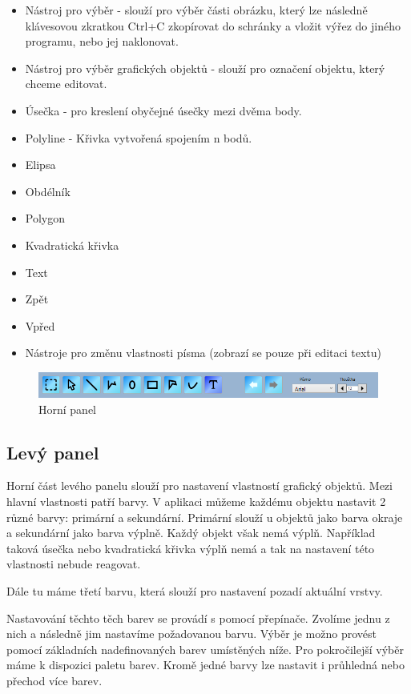\documentclass[
  field=inf,
  biblatex,
  glossaries,
  index
]{kidiplom}
\begin{document}
\begin{itemize}
\item Nástroj pro výběr - slouží pro výběr části obrázku, který lze následně klávesovou zkratkou Ctrl+C zkopírovat do schránky a vložit výřez do jiného programu, nebo jej naklonovat.
\item Nástroj pro výběr grafických objektů - slouží pro označení objektu, který chceme editovat.
\item Úsečka - pro kreslení obyčejné úsečky mezi dvěma body.
\item Polyline - Křivka vytvořená spojením n bodů.
\item Elipsa
\item Obdélník
\item Polygon
\item Kvadratická křivka
\item Text
\item Zpět
\item Vpřed
\item Nástroje pro změnu vlastnosti písma (zobrazí se pouze při editaci textu)
\end{itemize}
\newpage
\begin{figure}
\includegraphics[width=16cm]{img/toppanel}
\caption{Horní panel}
\end{figure}


\subsection{Levý panel}

Horní část levého panelu slouží pro nastavení vlastností grafický objektů. Mezi hlavní vlastnosti patří barvy. V aplikaci můžeme každému objektu nastavit 2 různé barvy: primární a sekundární. Primární slouží u objektů jako barva okraje a sekundární jako barva výplně. Každý objekt však nemá výplň. Například taková úsečka nebo kvadratická křivka výplň nemá a tak na nastavení této vlastnosti nebude reagovat. 

Dále tu máme třetí barvu, která slouží pro nastavení pozadí aktuální vrstvy.

Nastavování těchto těch barev se provádí s pomocí přepínače. Zvolíme jednu z nich a následně jim nastavíme požadovanou barvu. Výběr je možno provést pomocí základních nadefinovaných barev umístěných níže. Pro pokročilejší výběr máme k dispozici paletu barev. Kromě jedné barvy lze nastavit i průhledná nebo přechod více barev.
\end{document}
